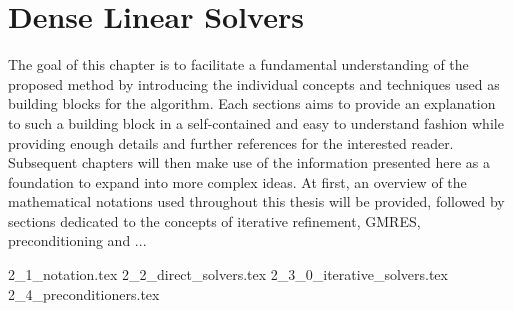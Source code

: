 \chapter{Dense Linear Solvers}
\label{chap:solvers}

The goal of this chapter is to facilitate a fundamental understanding of the proposed method by introducing the individual concepts and techniques used as building blocks for the algorithm. Each sections aims to provide an explanation to such a building block in a self-contained and easy to understand fashion while providing enough details and further references for the interested reader. Subsequent chapters will then make use of the information presented here as a foundation to expand into more complex ideas. At first, an overview of the mathematical notations used throughout this thesis will be provided, followed by sections dedicated to the concepts of iterative refinement, GMRES, preconditioning and ...

{2_1_notation.tex}
{2_2_direct_solvers.tex}
{2_3_0_iterative_solvers.tex}
{2_4_preconditioners.tex}